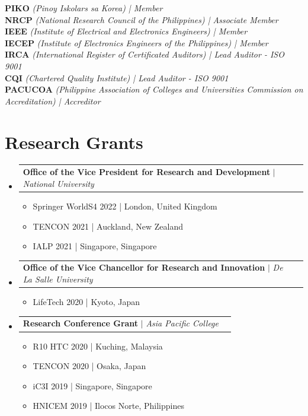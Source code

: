 \documentclass[a4paper,11pt]{article}
\makeatletter
\newcommand{\resumeItem}[1]{
  \item\small{
    {#1 \vspace{-2pt}}
  }
}
\newcommand{\resumeProjectHeading}[2]{
    \item
    \begin{tabular*}{0.97\textwidth}{l@{\extracolsep{\fill}}r}
      \small#1 & #2 \\
    \end{tabular*}\vspace{-7pt}
}
\newcommand{\resumeSubHeadingListStart}{\begin{itemize}[leftmargin=0.15in, label={}]}
\newcommand{\resumeSubHeadingListEnd}{\end{itemize}}
\newcommand{\resumeItemListStart}{\begin{itemize}}
\newcommand{\resumeItemListEnd}{\end{itemize}\vspace{-5pt}}
\makeatother
\begin{document}
\begin{itemize}[leftmargin=0.15in, label={}]
   \small{\item{
     \textbf{PIKO} \emph{(Pinoy Iskolars sa Korea) | Member} \\
     \textbf{NRCP} \emph{(National Research Council of the Philippines) | Associate Member} \\
     \textbf{IEEE} \emph{(Institute of Electrical and Electronics Engineers) | Member} \\
     \textbf{IECEP} \emph{(Institute of Electronics Engineers of the Philippines) | Member} \\
     \textbf{IRCA} \emph{(International Register of Certificated Auditors) | Lead Auditor - ISO 9001} \\
     \textbf{CQI} \emph{(Chartered Quality Institute) | Lead Auditor - ISO 9001} \\
     \textbf{PACUCOA} \emph{(Philippine Association of Colleges and Universities Commission on Accreditation) | Accreditor} \\
   }}
\end{itemize}
    
\section{Research Grants}
    \resumeSubHeadingListStart
      \resumeProjectHeading
          {\textbf{Office of the Vice President for Research and Development} $|$ \emph{National University}}{}
          \resumeItemListStart
            \resumeItem{Springer WorldS4 2022 | London, United Kingdom}
            \resumeItem{TENCON 2021 | Auckland, New Zealand}
            \resumeItem{IALP 2021 | Singapore, Singapore}
          \resumeItemListEnd
      \resumeProjectHeading
          {\textbf{Office of the Vice Chancellor for Research and Innovation} $|$ \emph{De La Salle University}}{}
          \resumeItemListStart
            \resumeItem{LifeTech 2020 | Kyoto, Japan}
          \resumeItemListEnd

        \resumeProjectHeading
          {\textbf{Research Conference Grant} $|$ \emph{Asia Pacific College}}{}
          \resumeItemListStart
            \resumeItem{R10 HTC 2020 | Kuching, Malaysia}
            \resumeItem{TENCON 2020 | Osaka, Japan}
            \resumeItem{iC3I 2019 | Singapore, Singapore}
            \resumeItem{HNICEM 2019 | Ilocos Norte, Philippines}
          \resumeItemListEnd
    \resumeSubHeadingListEnd
\end{document}

